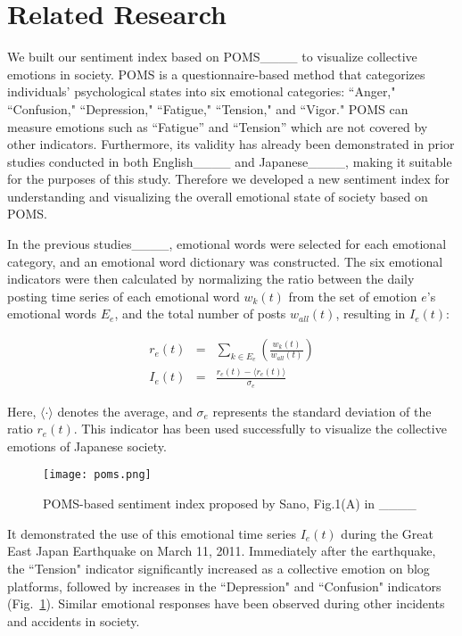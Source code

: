 \section{Related Research}
We built our sentiment index based on POMS____ to visualize collective emotions in society. 
POMS is a questionnaire-based method that categorizes individuals' psychological states into six emotional categories: ``Anger," ``Confusion," ``Depression," ``Fatigue," ``Tension," and ``Vigor." 
POMS can measure emotions such as ``Fatigue'' and ``Tension'' which are not covered by other indicators. 
Furthermore, its validity has already been demonstrated in prior studies conducted in both English____ and Japanese____, making it suitable for the purposes of this study.
Therefore we developed a new sentiment index for understanding and visualizing the overall emotional state of society based on POMS.

In the previous studies____, emotional words were selected for each emotional category, and an emotional word dictionary was constructed. The six emotional indicators were then calculated by normalizing the ratio between the daily posting time series of each emotional word $w_{k}(t)$ from the set of emotion $e$'s emotional words $E_{e}$, and the total number of posts $w_{all}(t)$, resulting in $I_{e}(t)$:

\begin{eqnarray} r_{e}(t) &=& \sum_{k \in E_{e}}\left(\frac{w_{k}(t)}{w_{all}(t)} \right) \\
I_{e}(t) &=& \frac{r_{e}(t)- \langle r_{e}(t) \rangle }{\sigma_{e}}
\end{eqnarray}

Here, $\langle \cdot \rangle$ denotes the average, and $\sigma_{e}$ represents the standard deviation of the ratio $r_{e}(t)$. This indicator has been used successfully to visualize the collective emotions of Japanese society.

\begin{figure}[tb] \centering \texttt{[image: poms.png]} \caption{POMS-based sentiment index proposed by Sano, Fig.1(A) in ____} \label{fig1} \end{figure}

It demonstrated the use of this emotional time series $I_e(t)$ during the Great East Japan Earthquake on March 11, 2011. Immediately after the earthquake, the ``Tension" indicator significantly increased as a collective emotion on blog platforms, followed by increases in the ``Depression" and ``Confusion" indicators (Fig.~\ref{fig1}). Similar emotional responses have been observed during other incidents and accidents in society.

